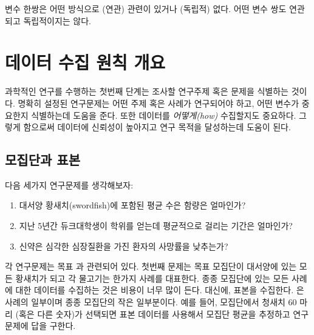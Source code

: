 \begin{termBox}{
변수 한쌍은 어떤 방식으로 (연관) 관련이 있거나 (독립적) 없다.
어떤 변수 쌍도 연관되고 독립적이지는 않다.}
\end{termBox}


\section[Overview of data collection principles]{데이터 수집 원칙 개요 }
\label{overviewOfDataCollectionPrinciples}


과학적인 연구를 수행하는 첫번째 단계는 조사할 연구주제 혹은 문제을 식별하는 것이다.
명확히 설정된 연구문제는 어떤 주제 혹은 사례가 연구되어야 하고, 어떤 변수가 중요한지 식별하는데 도움을 준다.
또한 데이터를 \emph{어떻게(how)} 수집할지도 중요하다. 그렇게 함으로써 데이터에 신뢰성이 높아지고 연구 목적을 달성하는데 도움이 된다.

\subsection{모집단과 표본}
\label{populationsAndSamples}

다음 세가지 연구문제를 생각해보자:

\begin{enumerate}
\setlength{\itemsep}{0mm}
\item 대서양 황새치(swordfish)에 포함된 평균 수은 함량은 얼마인가?

\item\label{timeToGraduationQuestionForUCLAStudents} 
지난 5년간 듀크대학생이 학위를 얻는데 평균적으로 걸리는 기간은 얼마인가?
\item\label{identifyPopulationOfStentStudy} 
신약은 심각한 심장질환을 가진 환자의 사망률을 낮추는가?
\end{enumerate}

각 연구문제는 목표 과 관련되어 있다.
첫번째 문제는 목표 모집단이 대서양에 있는 모든 황새치가 되고 각 물고기는 한가지 사례를 대표한다.
종종 모집단에 있는 모든 사례에 대한 데이터를 수집하는 것은 비용이 너무 많이 든다.
대신에, 표본을 수집한다. 은 사례의 일부이며 종종 모집단의 작은 일부분이다.
예를 들어, 모집단에서 청새치 60 마리 (혹은 다른 숫자)가 선택되면 표본 데이터를 사용해서 모집단 평균을 추정하고 연구문제에 답을 구한다.


